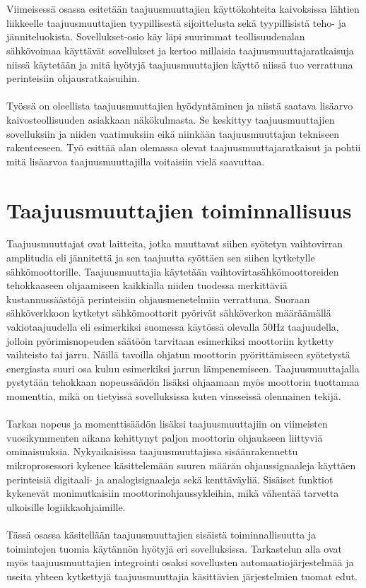 \documentclass[finnish,12pt,a4paper,pdftex,elec,utf8]{aaltothesis}
\begin{document}
\\\\
Viimeisessä osassa esitetään taajuusmuuttajien käyttökohteita kaivoksissa lähtien liikkeelle taajuusmuuttajien tyypillisestä sijoittelusta sekä tyypillisistä teho- ja jänniteluokista. Sovellukset-osio käy läpi suurimmat teollisuudenalan sähkövoimaa käyttävät sovellukset ja kertoo millaisia taajuusmuuttajaratkaisuja niissä käytetään ja mitä hyötyjä taajuusmuuttajien käyttö niissä tuo verrattuna perinteisiin ohjausratkaisuihin.
\\\\
Työssä on oleellista taajuusmuuttajien hyödyntäminen ja niistä saatava lisäarvo kaivosteollisuuden asiakkaan näkökulmasta. Se keskittyy taajuusmuuttajien sovelluksiin ja niiden vaatimuksiin eikä niinkään taajuusmuuttajan tekniseen rakenteeseen. Työ esittää alan olemassa olevat taajuusmuuttajaratkaisut ja pohtii mitä lisäarvoa taajuusmuuttajilla voitaisiin vielä saavuttaa.

\clearpage

\section{Taajuusmuuttajien toiminnallisuus}
Taajuusmuuttajat ovat laitteita, jotka muuttavat siihen syötetyn vaihtovirran amplitudia eli jännitettä ja sen taajuutta syöttäen sen siihen kytketylle sähkömoottorille. Taajuusmuuttajia käytetään vaihtovirtasähkömoottoreiden tehokkaaseen ohjaamiseen kaikkialla niiden tuodessa merkittäviä kustannussäästöjä perinteisiin ohjausmenetelmiin verrattuna. Suoraan sähköverkkoon kytketyt sähkömoottorit pyörivät sähköverkon määräämällä vakiotaajuudella eli esimerkiksi suomessa käytössä olevalla 50Hz taajuudella, jolloin pyörimisnopeuden säätöön tarvitaan esimerkiksi moottoriin kytketty vaihteisto tai jarru. Näillä tavoilla ohjatun moottorin pyörittämiseen syötetystä energiasta suuri osa kuluu esimerkiksi jarrun lämpenemiseen. Taajuusmuuttajalla pystytään tehokkaan nopeussäädön lisäksi ohjaamaan myös moottorin tuottamaa momenttia, mikä on tietyissä sovelluksissa kuten vinsseissä olennainen tekijä.
\\\\
Tarkan nopeus ja momenttisäädön lisäksi taajuusmuuttajiin on viimeisten vuosikymmenten aikana kehittynyt paljon moottorin ohjaukseen liittyviä ominaisuuksia. Nykyaikaisissa taajuusmuuttajissa sisäänrakennettu mikroprosessori kykenee käsittelemään suuren määrän ohjaussignaaleja käyttäen perinteisiä digitaali- ja analogisignaaleja sekä kenttäväyliä. Sisäiset funktiot kykenevät monimutkaisiin moottorinohjaussykleihin, mikä vähentää tarvetta ulkoisille logiikkaohjaimille.
\\\\
Tässä osassa käsitellään taajuusmuuttajien sisäistä toiminnallisuutta ja toimintojen tuomia käytännön hyötyjä eri sovelluksissa. Tarkastelun alla ovat myös taajuusmuuttajien integrointi osaksi sovellusten automaatiojärjestelmää ja useita yhteen kytkettyjä taajuusmuuttajia käsittävien järjestelmien tuomat edut.
\end{document}

